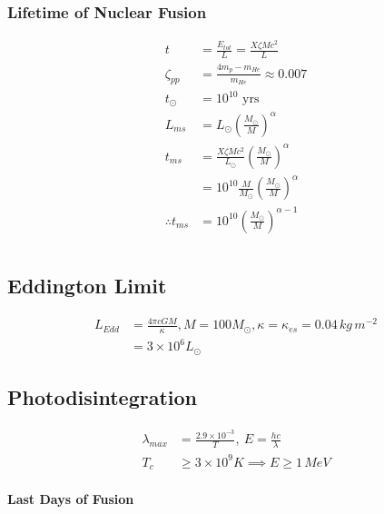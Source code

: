 \documentclass[a4paper,11pt,normalem]{article}
\begin{document}
\subsubsection{Lifetime of Nuclear Fusion}

\begin{align*}
    t &= \frac{E_{tot}}{L} = \frac{X\zeta Mc^2}{L} \\
    \zeta_{pp} &= \frac{4m_p - m_{He}}{m_{He}} \approx 0.007 \\
    t_{\odot} &= 10^{10} \text{ yrs} \\
    L_{ms} &= L_\odot \left(\frac{M_\odot}{M}\right)^{\alpha} \\
    t_{ms} &= \frac{X\zeta Mc^2}{L_\odot}\left(\frac{M_\odot}{M}\right)^{\alpha} \\
    &= 10^{10}\frac{M}{M_\odot}\left(\frac{M_\odot}{M}\right)^{\alpha} \\
    \therefore t_{ms} &= 10^{10}\left(\frac{M_\odot}{M}\right)^{\alpha - 1}
\end{align*}

\section{}

\subsection{Eddington Limit}

\begin{align*}
    L_{Edd} &= \frac{4\pi cGM}{\kappa}, M = 100M_\odot, \kappa = \kappa_{es} = 0.04\,kg\,m^{-2} \\
    &= 3\times10^6 L_{\odot}
\end{align*}

\subsection{Photodisintegration}

\begin{align*}
    \lambda_{max} &= \frac{2.9\times10^{-3}}{T}, ~ E = \frac{hc}{\lambda} \\
    T_c &\geq 3\times10^9 K \implies E \geq 1\,MeV
\end{align*}

\paragraph{Last Days of Fusion}
\end{document}
